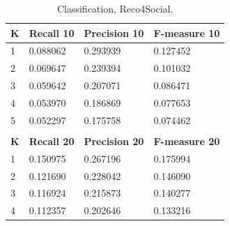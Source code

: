 \documentclass[12pt]{report}
\begin{document}
\begin{table}[htpb]
\centering
\caption{Classification, Reco4Social.}
\label{table.clas.reco1}
\vspace{3mm}
\begin{tabular}{llll}
\hline
\multicolumn{1}{|l|}{{\bf K}} & \multicolumn{1}{l|}{{\bf Recall 10}} & \multicolumn{1}{l|}{{\bf Precision 10}} & \multicolumn{1}{l|}{{\bf F-measure 10}} \\ \hline
\multicolumn{1}{|l|}{1}       & \multicolumn{1}{l|}{0.088062}        & \multicolumn{1}{l|}{0.293939}           & \multicolumn{1}{l|}{0.127452}           \\ \hline
\multicolumn{1}{|l|}{2}       & \multicolumn{1}{l|}{0.069647}        & \multicolumn{1}{l|}{0.239394}           & \multicolumn{1}{l|}{0.101032}           \\ \hline
\multicolumn{1}{|l|}{3}       & \multicolumn{1}{l|}{0.059642}        & \multicolumn{1}{l|}{0.207071}           & \multicolumn{1}{l|}{0.086471}           \\ \hline
\multicolumn{1}{|l|}{4}       & \multicolumn{1}{l|}{0.053970}        & \multicolumn{1}{l|}{0.186869}           & \multicolumn{1}{l|}{0.077653}           \\ \hline
\multicolumn{1}{|l|}{5}       & \multicolumn{1}{l|}{0.052297}        & \multicolumn{1}{l|}{0.175758}           & \multicolumn{1}{l|}{0.074462}           \\ \hline
                              &                                      &                                         &                                         \\ \hline
\multicolumn{1}{|l|}{{\bf K}} & \multicolumn{1}{l|}{{\bf Recall 20}} & \multicolumn{1}{l|}{{\bf Precision 20}} & \multicolumn{1}{l|}{{\bf F-measure 20}} \\ \hline
\multicolumn{1}{|l|}{1}       & \multicolumn{1}{l|}{0.150975}        & \multicolumn{1}{l|}{0.267196}           & \multicolumn{1}{l|}{0.175994}           \\ \hline
\multicolumn{1}{|l|}{2}       & \multicolumn{1}{l|}{0.121690}        & \multicolumn{1}{l|}{0.228042}           & \multicolumn{1}{l|}{0.146090}           \\ \hline
\multicolumn{1}{|l|}{3}       & \multicolumn{1}{l|}{0.116924}        & \multicolumn{1}{l|}{0.215873}           & \multicolumn{1}{l|}{0.140277}           \\ \hline
\multicolumn{1}{|l|}{4}       & \multicolumn{1}{l|}{0.112357}        & \multicolumn{1}{l|}{0.202646}           & \multicolumn{1}{l|}{0.133216}           \\ \hline

\end{tabular}
\end{table}
\end{document}
